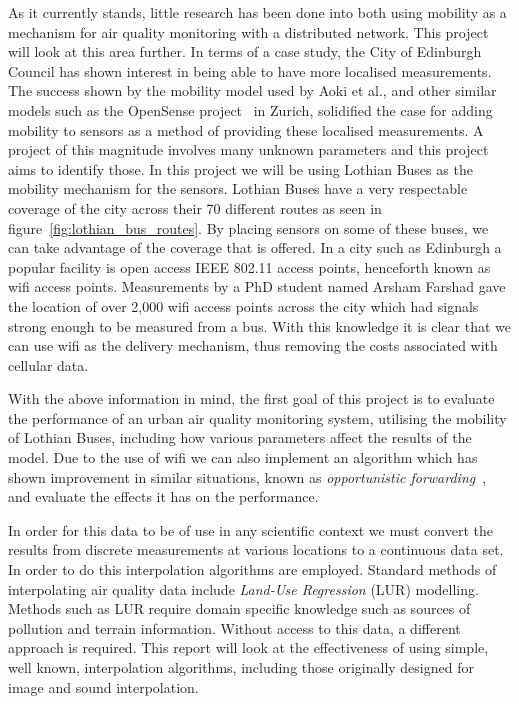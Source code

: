     As it currently stands, little research has been done into both using mobility as a mechanism for air quality monitoring with a distributed network. This project will look at this area further. In terms of a case study, the City of Edinburgh Council has shown interest in being able to have more localised measurements. The success shown by the mobility model used by Aoki et al., and other similar models such as the OpenSense project~\cite{opensensezurich} in Zurich, solidified the case for adding mobility to sensors as a method of providing these localised measurements. A project of this magnitude involves many unknown parameters and this project aims to identify those. In this project we will be using Lothian Buses as the mobility mechanism for the sensors. Lothian Buses have a very respectable coverage of the city across their 70 different routes as seen in figure~\ref{fig:lothian_bus_routes}. By placing sensors on some of these buses, we can take advantage of the coverage that is offered. In a city such as Edinburgh a popular facility is open access IEEE 802.11 access points, henceforth known as wifi access points. Measurements by a PhD student named Arsham Farshad gave the location of over 2,000 wifi access points across the city which had signals strong enough to be measured from a bus. With this knowledge it is clear that we can use wifi as the delivery mechanism, thus removing the costs associated with cellular data. 


    With the above information in mind, the first goal of this project is to evaluate the performance of an urban air quality monitoring system, utilising the mobility of Lothian Buses, including how various parameters affect the results of the model. Due to the use of wifi we can also implement an algorithm which has shown improvement in similar situations, known as \emph{opportunistic forwarding}~\cite{opporunisticforwarding}, and evaluate the effects it has on the performance. 

    In order for this data to be of use in any scientific context we must convert the results from discrete measurements at various locations to a continuous data set. In order to do this interpolation algorithms are employed. Standard methods of interpolating air quality data include \emph{Land-Use Regression} (LUR) modelling. Methods such as LUR require domain specific knowledge such as sources of pollution and terrain information. Without access to this data, a different approach is required. This report will look at the effectiveness of using simple, well known, interpolation algorithms, including those originally designed for image and sound interpolation. 

